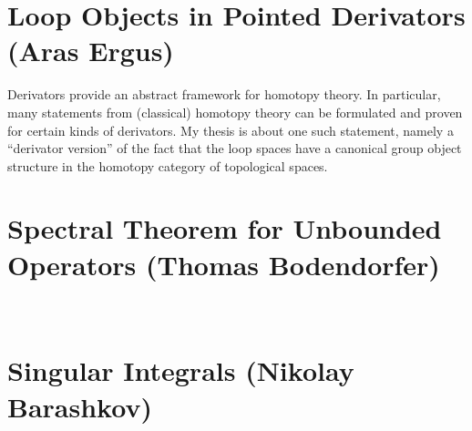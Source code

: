 \section{Loop Objects in Pointed Derivators (Aras Ergus)}

Derivators provide an abstract framework for homotopy
theory. In particular, many statements from (classical) homotopy theory
can be formulated and proven for certain kinds of derivators. My thesis
is about one such statement, namely a ``derivator version'' of the fact that
the loop spaces have a canonical group object structure in the homotopy
category of topological spaces.

\section{Spectral Theorem for Unbounded Operators (Thomas Bodendorfer)}

\

\section{Singular Integrals (Nikolay Barashkov)}

\ 
